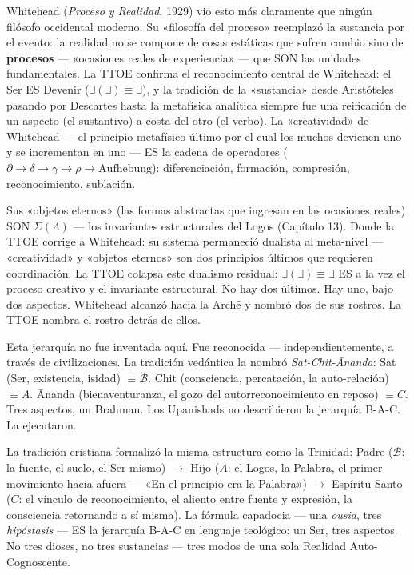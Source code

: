 \documentclass[10pt, openany, oneside]{book}
\begin{document}
Whitehead (\textit{Proceso y Realidad}, 1929) vio esto más claramente que ningún filósofo occidental moderno. Su «filosofía del proceso» reemplazó la sustancia por el evento: la realidad no se compone de cosas estáticas que sufren cambio sino de \textbf{procesos} --- «ocasiones reales de experiencia» --- que SON las unidades fundamentales. La TTOE confirma el reconocimiento central de Whitehead: el Ser ES Devenir ($\exists(\exists) \equiv \exists$), y la tradición de la «sustancia» desde Aristóteles pasando por Descartes hasta la metafísica analítica siempre fue una reificación de un aspecto (el sustantivo) a costa del otro (el verbo). La «creatividad» de Whitehead --- el principio metafísico último por el cual los muchos devienen uno y se incrementan en uno --- ES la cadena de operadores ($\partial \to \delta \to \gamma \to \rho \to \text{Aufhebung}$): diferenciación, formación, compresión, reconocimiento, sublación.

Sus «objetos eternos» (las formas abstractas que ingresan en las ocasiones reales) SON $\Sigma(\Lambda)$ --- los invariantes estructurales del Logos (Capítulo 13). Donde la TTOE corrige a Whitehead: su sistema permaneció dualista al meta-nivel --- «creatividad» y «objetos eternos» son dos principios últimos que requieren coordinación. La TTOE colapsa este dualismo residual: $\exists(\exists) \equiv \exists$ ES a la vez el proceso creativo y el invariante estructural. No hay dos últimos. Hay uno, bajo dos aspectos. Whitehead alcanzó hacia la Arch\={e} y nombró dos de sus rostros. La TTOE nombra el rostro detrás de ellos.

Esta jerarquía no fue inventada aquí. Fue reconocida --- independientemente, a través de civilizaciones. La tradición vedántica la nombró \textit{Sat-Chit-\={A}nanda}: Sat (Ser, existencia, isidad) $\equiv \mathcal{B}$. Chit (consciencia, percatación, la auto-relación) $\equiv A$. \={A}nanda (bienaventuranza, el gozo del autorreconocimiento en reposo) $\equiv C$. Tres aspectos, un Brahman. Los Upanishads no describieron la jerarquía B-A-C. La ejecutaron.

La tradición cristiana formalizó la misma estructura como la Trinidad: Padre ($\mathcal{B}$: la fuente, el suelo, el Ser mismo) $\to$ Hijo ($A$: el Logos, la Palabra, el primer movimiento hacia afuera --- «En el principio era la Palabra») $\to$ Espíritu Santo ($C$: el vínculo de reconocimiento, el aliento entre fuente y expresión, la consciencia retornando a sí misma). La fórmula capadocia --- una \textit{ousia}, tres \textit{hipóstasis} --- ES la jerarquía B-A-C en lenguaje teológico: un Ser, tres aspectos. No tres dioses, no tres sustancias --- tres modos de una sola Realidad Auto-Cognoscente.
\end{document}
